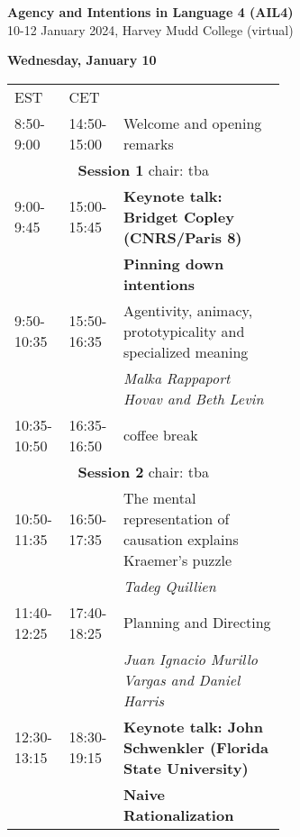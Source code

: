 \documentclass[11pt]{article}
\title{}
\author{}
\date{}
\begin{document}

\textbf{\Large{Agency and Intentions in Language 4 (AIL4)}} \\
10-12 January 2024, Harvey Mudd College (virtual) \\[-7pt]
\makebox[\linewidth]{\rule{\textwidth}{0.4pt}}

\vspace{1cm}

\textbf{Wednesday, January 10}\\[7pt]
\begin{tabular}{ll p{0.6\linewidth}}
EST	& CET &  \\
\rowcolor{gray!30}
8:50-9:00 & 14:50-15:00 & Welcome and opening remarks\\
\multicolumn{3}{c}{{\bf Session 1} chair: tba } \\
\hline
9:00-9:45  & 15:00-15:45 & \textbf{Keynote talk: Bridget Copley (CNRS/Paris 8)} \\
&& \textbf{Pinning down intentions }\\
\hline
9:50-10:35  & 15:50-16:35   & Agentivity, animacy, prototypicality and specialized meaning\\
&& \textit{Malka Rappaport Hovav and Beth Levin} \\
\rowcolor{gray!30}
10:35-10:50 & 16:35-16:50   & coffee break \\
\multicolumn{3}{c}{{\bf Session 2} chair: tba}\\
\hline
10:50-11:35 & 16:50-17:35   & The mental representation of causation explains Kraemer's puzzle\\
&& \textit{Tadeg Quillien} \\
\hline
11:40-12:25 & 17:40-18:25   & Planning and Directing \\
&&\textit{Juan Ignacio Murillo Vargas and Daniel Harris} \\
\hline
12:30-13:15 & 18:30-19:15   & \textbf{Keynote talk: John Schwenkler (Florida State University) }\\
&& \textbf{Naive Rationalization}\\
\end{tabular}

\vspace{2cm}
\end{document}
